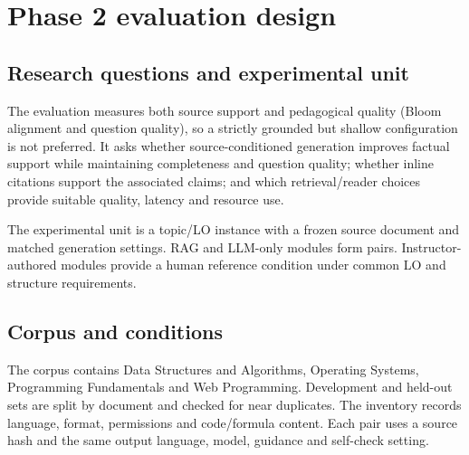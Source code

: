 \clearpage\section{Phase 2 evaluation design}\label{sec:evaluation}
\subsection{Research questions and experimental unit}
The evaluation measures both source support and pedagogical quality (Bloom alignment and question quality), so a strictly grounded but shallow configuration is not preferred. It asks whether source-conditioned generation improves factual support while maintaining completeness and question quality; whether inline citations support the associated claims; and which retrieval/reader choices provide suitable quality, latency and resource use.

The experimental unit is a topic/LO instance with a frozen source document and matched generation settings. RAG and LLM-only modules form pairs. Instructor-authored modules provide a human reference condition under common LO and structure requirements.
\subsection{Corpus and conditions}\label{sec:conditions}
The corpus contains Data Structures and Algorithms, Operating Systems, Programming Fundamentals and Web Programming. Development and held-out sets are split by document and checked for near duplicates. The inventory records language, format, permissions and code/formula content. Each pair uses a source hash and the same output language, model, guidance and self-check setting.

